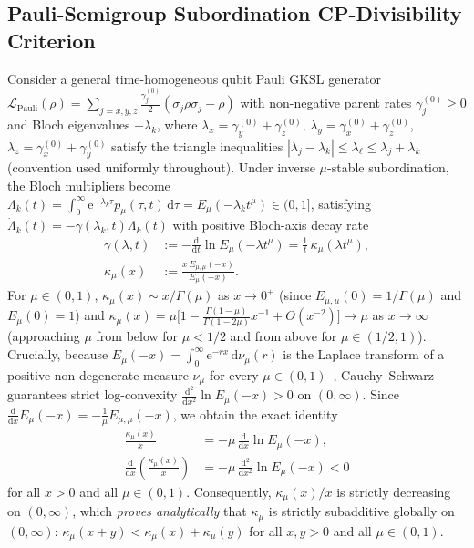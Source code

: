 \documentclass[twocolumn,10pt,amsmath,amssymb,floatfix]{revtex4-2}
\theoremstyle{plain}
\theoremstyle{definition}
\newcommand{\dd}{\mathrm{d}}
\newcommand{\ee}{\mathrm{e}}
\begin{document}
\subsection{Pauli-Semigroup Subordination CP-Divisibility Criterion}

Consider a general time-homogeneous qubit Pauli GKSL generator $\mathcal{L}_{\mathrm{Pauli}}(\rho) = \sum_{j=x,y,z} \frac{\gamma_j^{(0)}}{2}(\sigma_j \rho \sigma_j - \rho)$ with non-negative parent rates $\gamma_j^{(0)} \ge 0$ and Bloch eigenvalues $-\lambda_k$, where $\lambda_x = \gamma_y^{(0)} + \gamma_z^{(0)}$, $\lambda_y = \gamma_x^{(0)} + \gamma_z^{(0)}$, $\lambda_z = \gamma_x^{(0)} + \gamma_y^{(0)}$ satisfy the triangle inequalities $|\lambda_j - \lambda_k| \le \lambda_\ell \le \lambda_j + \lambda_k$ (convention used uniformly throughout). Under inverse $\mu$-stable subordination, the Bloch multipliers become $\Lambda_k(t) = \int_0^\infty \ee^{-\lambda_k \tau} p_\mu(\tau,t)\,\dd\tau = E_\mu(-\lambda_k t^\mu) \in (0,1]$, satisfying $\dot{\Lambda}_k(t) = -\gamma(\lambda_k, t)\Lambda_k(t)$ with positive Bloch-axis decay rate
\begin{align}
\label{eq:kappa_rate}
\gamma(\lambda, t) &:= -\frac{\dd}{\dd t}\ln E_\mu(-\lambda t^\mu) = \frac{1}{t}\,\kappa_\mu(\lambda t^\mu), \nonumber\\
\kappa_\mu(x) &:= \frac{x\,E_{\mu,\mu}(-x)}{E_\mu(-x)}.
\end{align}
For $\mu \in (0,1)$, $\kappa_\mu(x) \sim x/\Gamma(\mu)$ as $x \to 0^+$ (since $E_{\mu,\mu}(0) = 1/\Gamma(\mu)$ and $E_\mu(0)=1$) and $\kappa_\mu(x) = \mu\big[1 - \frac{\Gamma(1-\mu)}{\Gamma(1-2\mu)}x^{-1} + O(x^{-2})\big] \to \mu$ as $x \to \infty$ (approaching $\mu$ from below for $\mu < 1/2$ and from above for $\mu \in (1/2, 1)$). Crucially, because $E_\mu(-x) = \int_0^\infty \ee^{-rx}\,\dd\nu_\mu(r)$ is the Laplace transform of a positive non-degenerate measure $\nu_\mu$ for every $\mu \in (0,1)$~\cite{Pollard1948BAMS}, Cauchy--Schwarz guarantees strict log-convexity $\frac{\dd^2}{\dd x^2}\ln E_\mu(-x) > 0$ on $(0,\infty)$. Since $\frac{\dd}{\dd x}E_\mu(-x) = -\frac{1}{\mu}E_{\mu,\mu}(-x)$, we obtain the exact identity
\begin{align}
\label{eq:pollard_subadd}
\frac{\kappa_\mu(x)}{x} &= -\mu\,\frac{\dd}{\dd x}\ln E_\mu(-x), \nonumber\\
\frac{\dd}{\dd x}\!\left(\frac{\kappa_\mu(x)}{x}\right) &= -\mu\,\frac{\dd^2}{\dd x^2}\ln E_\mu(-x) < 0
\end{align}
for all $x > 0$ and all $\mu \in (0,1)$. Consequently, $\kappa_\mu(x)/x$ is strictly decreasing on $(0,\infty)$, which \emph{proves analytically} that $\kappa_\mu$ is strictly subadditive globally on $(0,\infty)$: $\kappa_\mu(x+y) < \kappa_\mu(x) + \kappa_\mu(y)$ for all $x, y > 0$ and all $\mu \in (0,1)$.
\end{document}

